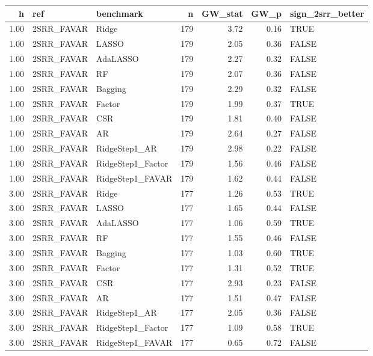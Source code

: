 \begin{table}[ht]
\centering
\begin{tabular}{rllrrrl}
  \hline
h & ref & benchmark & n & GW\_stat & GW\_p & sign\_2srr\_better \\ 
  \hline
1.00 & 2SRR\_FAVAR & Ridge & 179 & 3.72 & 0.16 & TRUE \\ 
  1.00 & 2SRR\_FAVAR & LASSO & 179 & 2.05 & 0.36 & FALSE \\ 
  1.00 & 2SRR\_FAVAR & AdaLASSO & 179 & 2.27 & 0.32 & FALSE \\ 
  1.00 & 2SRR\_FAVAR & RF & 179 & 2.07 & 0.36 & FALSE \\ 
  1.00 & 2SRR\_FAVAR & Bagging & 179 & 2.29 & 0.32 & FALSE \\ 
  1.00 & 2SRR\_FAVAR & Factor & 179 & 1.99 & 0.37 & TRUE \\ 
  1.00 & 2SRR\_FAVAR & CSR & 179 & 1.81 & 0.40 & FALSE \\ 
  1.00 & 2SRR\_FAVAR & AR & 179 & 2.64 & 0.27 & FALSE \\ 
  1.00 & 2SRR\_FAVAR & RidgeStep1\_AR & 179 & 2.98 & 0.22 & FALSE \\ 
  1.00 & 2SRR\_FAVAR & RidgeStep1\_Factor & 179 & 1.56 & 0.46 & FALSE \\ 
  1.00 & 2SRR\_FAVAR & RidgeStep1\_FAVAR & 179 & 1.62 & 0.44 & FALSE \\ 
  3.00 & 2SRR\_FAVAR & Ridge & 177 & 1.26 & 0.53 & TRUE \\ 
  3.00 & 2SRR\_FAVAR & LASSO & 177 & 1.65 & 0.44 & FALSE \\ 
  3.00 & 2SRR\_FAVAR & AdaLASSO & 177 & 1.06 & 0.59 & TRUE \\ 
  3.00 & 2SRR\_FAVAR & RF & 177 & 1.55 & 0.46 & FALSE \\ 
  3.00 & 2SRR\_FAVAR & Bagging & 177 & 1.03 & 0.60 & TRUE \\ 
  3.00 & 2SRR\_FAVAR & Factor & 177 & 1.31 & 0.52 & TRUE \\ 
  3.00 & 2SRR\_FAVAR & CSR & 177 & 2.93 & 0.23 & FALSE \\ 
  3.00 & 2SRR\_FAVAR & AR & 177 & 1.51 & 0.47 & FALSE \\ 
  3.00 & 2SRR\_FAVAR & RidgeStep1\_AR & 177 & 2.05 & 0.36 & FALSE \\ 
  3.00 & 2SRR\_FAVAR & RidgeStep1\_Factor & 177 & 1.09 & 0.58 & TRUE \\ 
  3.00 & 2SRR\_FAVAR & RidgeStep1\_FAVAR & 177 & 0.65 & 0.72 & FALSE \\ 

\end{tabular}
\end{table}
